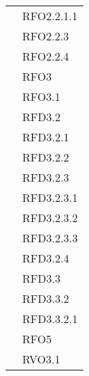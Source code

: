 \begin{longtable}{|>{\centering}m{10cm}|m{3cm}<{\centering}|}
& RFO2.2.1.1\\
& RFO2.2.3\\
& RFO2.2.4\\
& RFO3\\
& RFO3.1\\
& RFD3.2\\
& RFD3.2.1\\
& RFD3.2.2\\
& RFD3.2.3\\
& RFD3.2.3.1\\
& RFD3.2.3.2\\
& RFD3.2.3.3\\
& RFD3.2.4\\
& RFD3.3\\
& RFD3.3.2\\
& RFD3.3.2.1\\
& RFO5\\
& RVO3.1\\ \hline


\end{longtable}
